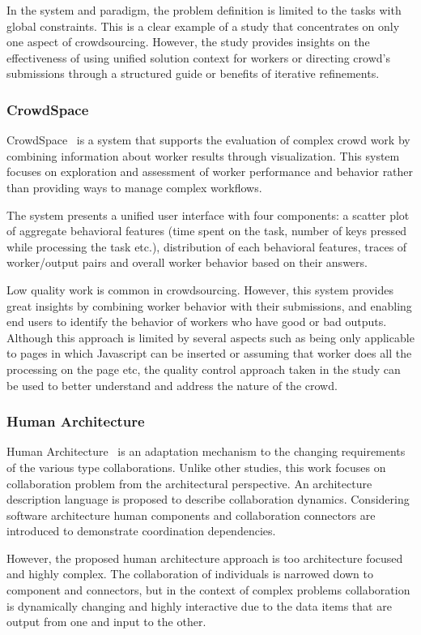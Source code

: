 In the system and paradigm, the problem definition is limited to the tasks 
with global constraints. This is a clear example of a study that concentrates 
on only one aspect of crowdsourcing. However, the study provides insights 
on the effectiveness of using unified solution context for workers or directing 
crowd's submissions through a structured guide or benefits of iterative refinements.

\subsubsection{CrowdSpace}
CrowdSpace~\cite{Rzeszotarski2012} is a system that supports the evaluation 
of complex crowd work by combining information about worker results through 
visualization. This system focuses on exploration and assessment of worker 
performance and behavior rather than providing ways to manage complex workflows.

The system presents a unified user interface with four components: a scatter plot 
of aggregate behavioral features (time spent on the task, number of keys pressed 
while processing the task etc.), distribution of each behavioral features, 
traces of worker/output pairs and overall worker behavior based on their answers.

Low quality work is common in crowdsourcing. However, this system provides 
great insights by combining worker behavior with their submissions, and enabling 
end users to identify the behavior of workers who have good or bad outputs. 
Although this approach is limited by several aspects such as being only applicable to 
pages in which Javascript can be inserted or assuming that worker does all the processing 
on the page etc, the quality control approach taken in the study can be used to 
better understand and address the nature of the crowd.

\subsubsection{Human Architecture}
Human Architecture~\cite{Dorn2012} is an adaptation mechanism to the changing 
requirements of the various type collaborations. Unlike other studies, this work focuses 
on collaboration problem from the architectural perspective. An architecture description 
language is proposed to describe collaboration dynamics. Considering software architecture 
human components and collaboration connectors are introduced to demonstrate 
coordination dependencies. 

However, the proposed human architecture approach is too architecture focused and 
highly complex. The collaboration of individuals is narrowed down to component 
and connectors, but in the context of complex problems collaboration is dynamically 
changing and highly interactive due to the data items that are output from one 
and input to the other. 